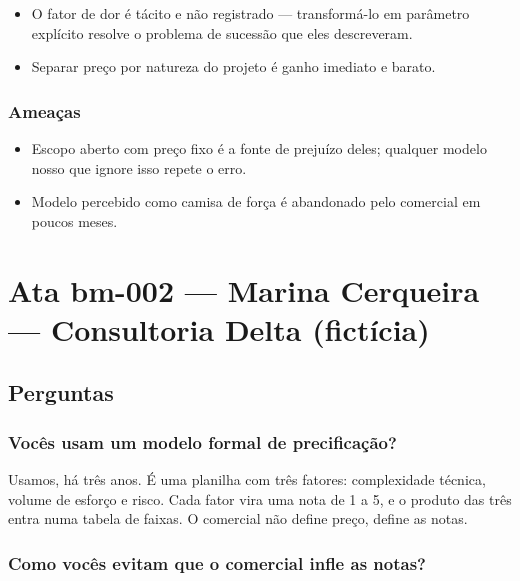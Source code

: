 \begin{itemize}
  \item O fator de dor é tácito e não registrado — transformá-lo em parâmetro explícito resolve o problema de sucessão que eles descreveram.
  \item Separar preço por natureza do projeto é ganho imediato e barato.
\end{itemize}

\subsubsection{Ameaças}

\begin{itemize}
  \item Escopo aberto com preço fixo é a fonte de prejuízo deles; qualquer modelo nosso que ignore isso repete o erro.
  \item Modelo percebido como camisa de força é abandonado pelo comercial em poucos meses.
\end{itemize}


\clearpage
\section{Ata bm-002 — Marina Cerqueira — Consultoria Delta (fictícia)}



\subsection{Perguntas}

\subsubsection{Vocês usam um modelo formal de precificação?}

Usamos, há três anos. É uma planilha com três fatores: complexidade técnica, volume de esforço e risco. Cada fator vira uma nota de 1 a 5, e o produto das três entra numa tabela de faixas. O comercial não define preço, define as notas.

\subsubsection{Como vocês evitam que o comercial infle as notas?}


